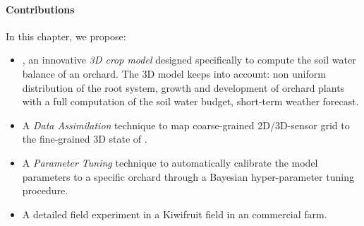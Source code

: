 


\paragraph{Contributions} In this chapter, we propose:
\begin{itemize}
	\item \olab{}, an innovative \textit{3D crop model} designed specifically to compute the soil water balance of an orchard.
    The 3D model keeps into account: non uniform distribution of the root system, growth and development of orchard plants with a full computation of the soil water budget, short-term weather forecast.
    \item A \textit{Data Assimilation} technique to map coarse-grained 2D/3D-sensor grid to the fine-grained 3D state of \olab{}.
    \item A \textit{Parameter Tuning} technique to automatically calibrate the model parameters to a specific orchard through a Bayesian hyper-parameter tuning procedure.
	\item A detailed field experiment in a Kiwifruit field in an commercial farm.
\end{itemize}

